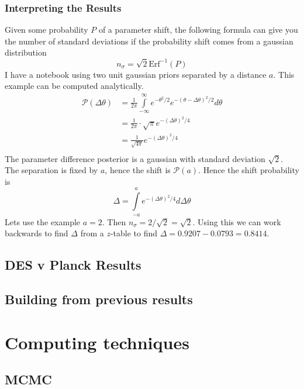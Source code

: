\subsubsection{Interpreting the Results}

Given some probability $P$ of a parameter shift, the following formula can give you the number of standard deviations if the probability shift comes from a gaussian distribution
\begin{equation}
	n_\sigma = \sqrt{2} \text{Erf}^{-1}(P)
\end{equation}
I have a notebook using two unit gaussian priors separated by a distance $a$. This example can be computed analytically.
\begin{equation}
    \begin{split}
	\mathcal{P}(\Delta \theta) &= \frac{1}{2\pi} \int\limits_{-\infty}^{\infty} e^{-\theta^2/2} e^{-{(\theta-\Delta\theta)}^2/2}  d\theta \\
				  			   &= \frac{1}{2\pi} \cdot \sqrt{\pi} e^{-{(\Delta\theta)}^2/4}\\
				   			   &= \frac{1}{\sqrt{4\pi}}e^{-{(\Delta\theta)}^2/4}\\
    \end{split}
\end{equation}
The parameter difference posterior is a gaussian with standard deviation $\sqrt{2}$. The separation is fixed by $a$, hence the shift is $\mathcal{P}(a)$. Hence the shift probability is
\begin{equation}
	\Delta = \int\limits_{-a}^{a} e^{-{(\Delta\theta)}^2/4} d\Delta\theta
\end{equation}
Lets use the example $a=2$. Then $n_\sigma = 2/\sqrt{2} = \sqrt{2}$. Using this we can work backwards to find $\Delta$ from a $z$-table to find $\Delta = 0.9207 - 0.0793 = 0.8414 $. 

\subsection{DES v Planck Results}
\subsection{Building from previous results}
\section{Computing techniques}
\subsection{MCMC}

